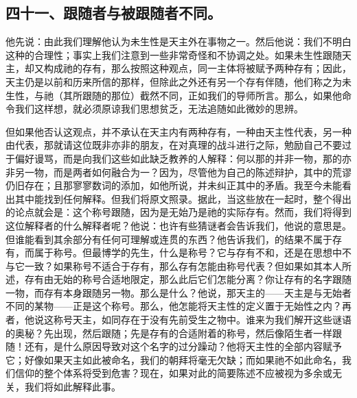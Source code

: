 \subsection{四十一、跟随者与被跟随者不同。}

他先说：由此我们理解他认为未生性是天主外在事物之一。然后他说：我们不明白这种的合理性；事实上我们注意到一些非常奇怪和不协调之处。如果未生性跟随天主，却又构成祂的存有，那么按照这种观点，同一主体将被赋予两种存有；因此，天主仍是以前和历来所信的那样，但除此之外还有另一个存有伴随，他们称之为未生性，与祂（其所跟随的那位）截然不同，正如我们的导师所言。那么，如果他命令我们这样想，就必须原谅我们思想贫乏，无法追随如此微妙的思辨。\par

但如果他否认这观点，并不承认在天主内有两种存有，一种由天主性代表，另一种由代表，那就请这位既非亦非的朋友，在对真理的战斗进行之际，勉励自己不要过于偏好谩骂，而是向我们这些如此缺乏教养的人解释：何以那的并非一物，那的亦非另一物，而是两者如何融合为一？因为，尽管他为自己的陈述辩护，其中的荒谬仍旧存在；且那寥寥数词的添加，如他所说，并未纠正其中的矛盾。我至今未能看出其中能找到任何解释。但我们将原文照录。据此，当这些放在一起时，整个得出的论点就会是：这个称号跟随，因为是无始乃是祂的实际存有。然而，我们将得到这位解释者的什么解释者呢？他说：也许有些猜谜者会告诉我们，他说的意思是。但谁能看到其余部分有任何可理解或连贯的东西？他告诉我们，的结果不属于存有，而属于称号。但最博学的先生，什么是称号？它与存有不和，还是在思想中不与它一致？如果称号不适合于存有，那么存有怎能由称号代表？但如果如其本人所述，存有由无始的称号合适地限定，那么此后它们怎能分离？你让存有的名字跟随一物，而存有本身跟随另一物。那么是什么？他说，那天主的——天主是与无始者不同的某物——正是这个称号。那么，他怎能将天主性的定义置于无始性之内？再者，他说这称号天主，如同存在于没有先前受生之物中。谁来为我们解开这些谜语的奥秘？先出现，然后跟随；先是存有的合适附着的称号，然后像陌生者一样跟随！还有，是什么原因导致对这个名字的过分躁动？他将天主性的全部内容赋予它；好像如果天主如此被命名，我们的朝拜将毫无欠缺；而如果祂不如此命名，我们信仰的整个体系将受到危害？现在，如果对此的简要陈述不应被视为多余或无关，我们将如此解释此事。\par

